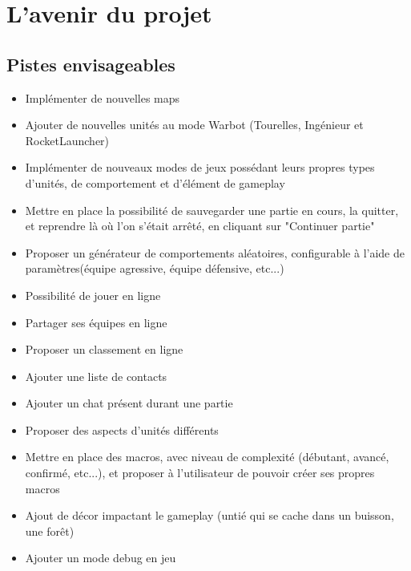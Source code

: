 \documentclass{report}
\begin{document}
\newpage
\part{L'avenir du projet}
\chapter{Pistes envisageables}
\begin{itemize}
\item Implémenter de nouvelles maps
\item Ajouter de nouvelles unités au mode Warbot (Tourelles, Ingénieur et RocketLauncher)
\item Implémenter de nouveaux modes de jeux possédant leurs propres types d'unités, de comportement et d'élément de gameplay
\item Mettre en place la possibilité de sauvegarder une partie en cours, la quitter, et reprendre là où l'on s'était arrêté, en cliquant sur "Continuer partie"
\item Proposer un générateur de comportements aléatoires, configurable à l'aide de paramètres(équipe agressive, équipe défensive, etc...)
\item Possibilité de jouer en ligne
\item Partager ses équipes en ligne
\item Proposer un classement en ligne
\item Ajouter une liste de contacts
\item Ajouter un chat présent durant une partie
\item Proposer des aspects d'unités différents
\item Mettre en place des macros, avec niveau de complexité (débutant, avancé, confirmé, etc...), et proposer à l'utilisateur de pouvoir créer ses propres macros
\item Ajout de décor impactant le gameplay (untié qui se cache dans un buisson, une forêt)
\item Ajouter un mode debug en jeu
\end{itemize}
\end{document}

